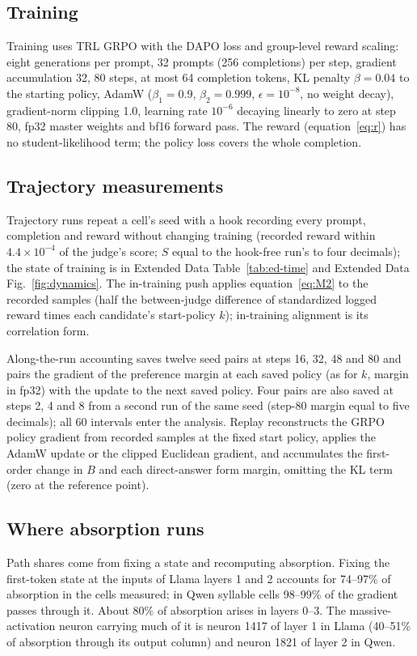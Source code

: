 \subsection{Training}
\label{S-sec:m-training}

Training uses TRL\cite{r17} GRPO with the DAPO loss\cite{r18} and group-level reward scaling\cite{liu2025understanding}: eight generations per prompt, 32 prompts (256 completions) per step, gradient accumulation 32, 80 steps, at most 64 completion tokens, KL penalty $\beta = 0.04$ to the starting policy\cite{ziegler2019finetuning}, AdamW\cite{loshchilov2019decoupled} ($\beta_1 = 0.9$, $\beta_2 = 0.999$, $\epsilon = 10^{-8}$, no weight decay), gradient-norm clipping 1.0, learning rate $10^{-6}$ decaying linearly to zero at step 80, fp32 master weights and bf16 forward pass. The reward (equation~\eqref{eq:r}) has no student-likelihood term; the policy loss covers the whole completion.

\subsection{Trajectory measurements}
\label{S-sec:m-trajectory}

Trajectory runs repeat a cell's seed with a hook recording every prompt, completion and reward without changing training (recorded reward within $4.4 \times 10^{-4}$ of the judge's score; $S$ equal to the hook-free run's to four decimals); the state of training is in Extended Data Table~\ref{tab:ed-time} and Extended Data Fig.~\ref{fig:dynamics}. The in-training push applies equation~\eqref{eq:M2} to the recorded samples (half the between-judge difference of standardized logged reward times each candidate's start-policy $k$); in-training alignment is its correlation form.

Along-the-run accounting saves twelve seed pairs at steps 16, 32, 48 and 80 and pairs the gradient of the preference margin at each saved policy (as for $k$, margin in fp32) with the update to the next saved policy. Four pairs are also saved at steps 2, 4 and 8 from a second run of the same seed (step-80 margin equal to five decimals); all 60 intervals enter the analysis. Replay reconstructs the GRPO policy gradient from recorded samples at the fixed start policy, applies the AdamW update or the clipped Euclidean gradient, and accumulates the first-order change in $B$ and each direct-answer form margin, omitting the KL term (zero at the reference point).

\subsection{Where absorption runs}
Path shares come from fixing a state and recomputing absorption. Fixing the first-token state at the inputs of Llama layers 1 and 2 accounts for 74--97\% of absorption in the cells measured; in Qwen syllable cells 98--99\% of the gradient passes through it. About 80\% of absorption arises in layers 0--3. The massive-activation neuron\cite{r14} carrying much of it is neuron 1417 of layer 1 in Llama (40--51\% of absorption through its output column) and neuron 1821 of layer 2 in Qwen.

